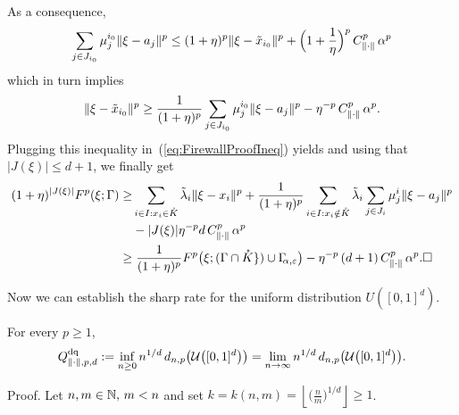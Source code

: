 As a consequence, 
\[ 
\sum_{j\in J_{i_0}} \mu^{i_0}_j \lVert\xi - a_j\rVert^p  \leq
(1+\eta)^p \lVert\xi - \tilde x_{i_0}\rVert^p + \Bigl(1+\frac{1}{\eta}
  \Bigr)^p\, C^p_{\lVert\cdot\rVert}\, \alpha^p
\] 
which in turn implies
 \[
\lVert\xi - \tilde x_{i_0}\rVert^p\ge \frac{1}{(1+\eta)^p}\sum_{j\in J_{i_0}} \mu^{i_0}_j \lVert\xi - a_j\rVert^p- \eta^{-p}\, C^p_{\lVert\cdot\rVert}\, \alpha^p.
\] 
Plugging this inequality in~(\ref{eq:FirewallProofIneq}) yields and using that
$|J(\xi)|\le d+1$, we finally get
\begin{equation*}
\begin{split}
 (1+\eta)^{|J(\xi)|} \Fp(\xi; \Gamma) 
  \ge &  \sum_{i\in I : x_i\in \mathring{K}} \tilde \lambda_i  \norm{\xi -  x_{i}}^p  +  \frac{1}{(1+\eta)^p}\sum_{i\in I : x_i\notin \mathring{K}}\tilde \lambda_i\sum_{j\in J_{i}}\mu^i_j\norm{\xi-a_j}^p\\
		&- |J(\xi)|\eta^{-p} d\, C^p_{\norm{\cdot}}\, \alpha^p\\
   \geq  &\; \frac{1}{(1+\eta)^p} \Fp\bigl(\xi; (\Gamma \cap \mathring K\})
  \cup \Gae \bigr) -\eta^{-p}\,(d+1)\,   C^p_{\norm{\cdot}}\, \alpha^p.\hfill \Box
\end{split}
\end{equation*}

Now we can establish
the sharp rate for the uniform distribution $U([0,1]^d)$.

\begin{prop}\label{prop:rateU} For every $p\ge 1$,
\[
Q^{\text{dq}}_{\lVert\cdot\rVert, p, d}:= \inf_{n\geq 0} n^{1/d}\,
d_{n,p}\bigl(\mathcal{U}\bigl([0,1]^d\bigr) \bigr) = \lim_{n\to\infty} n^{1/d}\, d_{n,p}\bigl(\mathcal{U}\bigl([0,1]^d\bigr) \bigr).
\]
\end{prop}
{\sc Proof.}
Let $n,m \in \mathbb{N},\, m<n$ and set $k = k(n,m) = \left\lfloor
\bigl(\frac{n}{m}\bigr)^{1/d} \right\rfloor \ge 1$.

